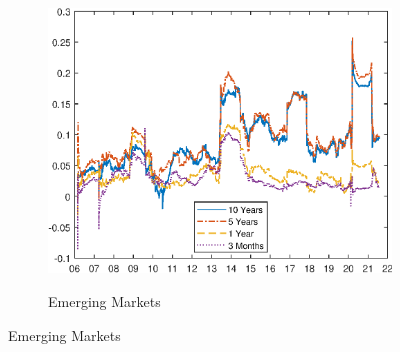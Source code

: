 \documentclass[a4paper, 12pt]{article}
\begin{document}
\begin{appendices}
	\begin{figure}[tbph]
		\caption{Comovement of Yield Curves: Rolling Correlations} \label{fig:rolling_ts}
		\begin{center}
			\begin{minipage}{0.9\linewidth}
				\begin{center}
					\begin{subfigure}[t]{\linewidth}
						\includegraphics[trim={0cm 0cm 0cm 0cm},clip,height=0.38\textheight,width=\linewidth]{../Figures/rolling_dn_data.eps} \\
						\vspace{-0.37cm}
						\caption{Emerging Markets} \label{subfig:rolling_tsEM}
						\vspace{0.4cm}
					\end{subfigure}
					

\end{center}
\end{minipage}
\end{center}
\end{figure}
\end{appendices}
\end{document}
